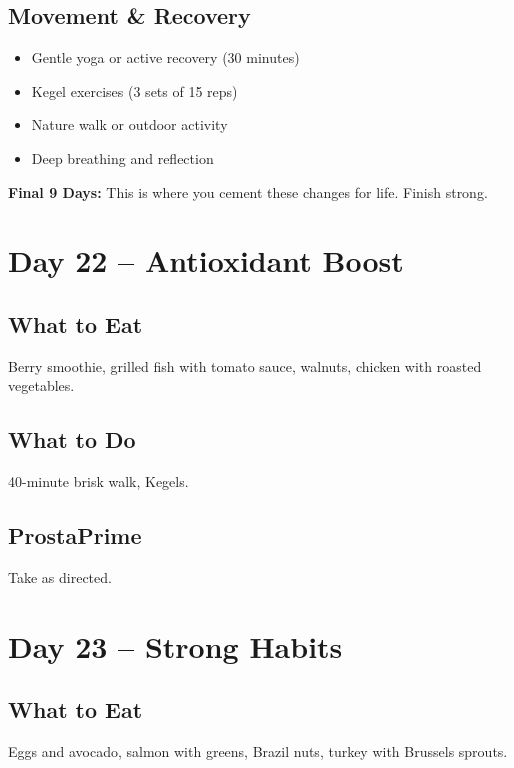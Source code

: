 \documentclass[11pt,oneside]{book}
\begin{document}
\section*{Movement \& Recovery}
\begin{itemize}[leftmargin=*]
\item Gentle yoga or active recovery (30 minutes)
\item Kegel exercises (3 sets of 15 reps)
\item Nature walk or outdoor activity
\item Deep breathing and reflection
\end{itemize}

\textbf{Final 9 Days:} This is where you cement these changes for life. Finish strong.

\clearpage


\chapter*{Day 22 – Antioxidant Boost}

\section*{What to Eat}
Berry smoothie, grilled fish with tomato sauce, walnuts, chicken with roasted vegetables.

\section*{What to Do}
40-minute brisk walk, Kegels.

\section*{ProstaPrime}
Take as directed.

\clearpage


\chapter*{Day 23 – Strong Habits}

\section*{What to Eat}
Eggs and avocado, salmon with greens, Brazil nuts, turkey with Brussels sprouts.
\end{document}
